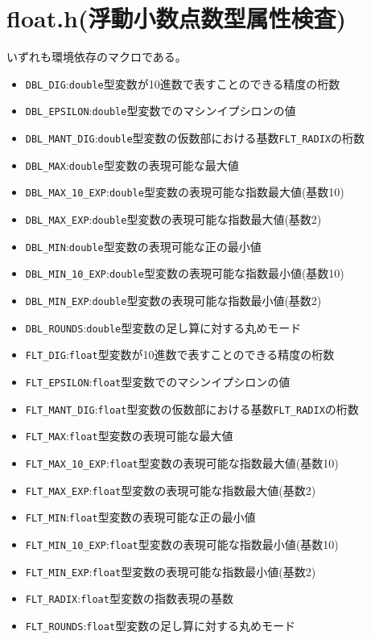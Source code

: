 \section{float.h(浮動小数点数型属性検査)}
いずれも環境依存のマクロである。
\begin{itemize}
\item \verb|DBL_DIG|:\verb|double|型変数が10進数で表すことのできる精度の桁数
\item \verb|DBL_EPSILON|:\verb|double|型変数でのマシンイプシロンの値
\item \verb|DBL_MANT_DIG|:\verb|double|型変数の仮数部における基数\verb|FLT_RADIX|の桁数
\item \verb|DBL_MAX|:\verb|double|型変数の表現可能な最大値
\item \verb|DBL_MAX_10_EXP|:\verb|double|型変数の表現可能な指数最大値(基数10)
\item \verb|DBL_MAX_EXP|:\verb|double|型変数の表現可能な指数最大値(基数2)
\item \verb|DBL_MIN|:\verb|double|型変数の表現可能な正の最小値
\item \verb|DBL_MIN_10_EXP|:\verb|double|型変数の表現可能な指数最小値(基数10)
\item \verb|DBL_MIN_EXP|:\verb|double|型変数の表現可能な指数最小値(基数2)
\item \verb|DBL_ROUNDS|:\verb|double|型変数の足し算に対する丸めモード
\item \verb|FLT_DIG|:\verb|float|型変数が10進数で表すことのできる精度の桁数
\item \verb|FLT_EPSILON|:\verb|float|型変数でのマシンイプシロンの値
\item \verb|FLT_MANT_DIG|:\verb|float|型変数の仮数部における基数\verb|FLT_RADIX|の桁数
\item \verb|FLT_MAX|:\verb|float|型変数の表現可能な最大値
\item \verb|FLT_MAX_10_EXP|:\verb|float|型変数の表現可能な指数最大値(基数10)
\item \verb|FLT_MAX_EXP|:\verb|float|型変数の表現可能な指数最大値(基数2)
\item \verb|FLT_MIN|:\verb|float|型変数の表現可能な正の最小値
\item \verb|FLT_MIN_10_EXP|:\verb|float|型変数の表現可能な指数最小値(基数10)
\item \verb|FLT_MIN_EXP|:\verb|float|型変数の表現可能な指数最小値(基数2)
\item \verb|FLT_RADIX|:\verb|float|型変数の指数表現の基数
\item \verb|FLT_ROUNDS|:\verb|float|型変数の足し算に対する丸めモード

\end{itemize}

